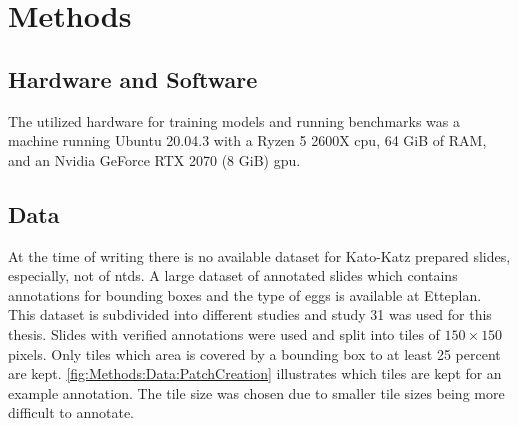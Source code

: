 \chapter{Methods}
\label{ch:Methods}


\section{Hardware and Software}
\label{sec:Methods:Hardware}

The utilized hardware for training models and running benchmarks was a machine running Ubuntu 20.04.3 with a Ryzen 5 2600X \ac{cpu}, 64 GiB of RAM, and an Nvidia GeForce RTX 2070 (8 GiB) \ac{gpu}.


\section{Data}
\label{sec:Methods:Data}

At the time of writing there is no available dataset for Kato-Katz prepared slides, especially, not of \acp{ntd}. A large dataset of annotated slides which contains annotations for bounding boxes and the type of eggs is available at Etteplan. This dataset is subdivided into different studies and study 31 was used for this thesis.  Slides with verified annotations were used and split into tiles of $150 \times 150$ pixels. Only tiles which area is covered by a bounding box to at least 25 percent are kept. \autoref{fig:Methods:Data:PatchCreation} illustrates which tiles are kept for an example annotation. The tile size was chosen due to smaller tile sizes being more difficult to annotate.

